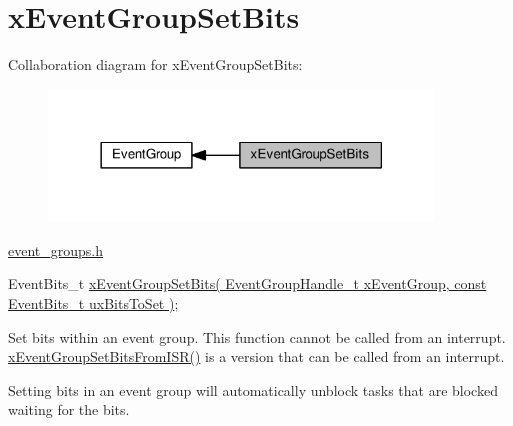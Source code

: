 \hypertarget{group__xEventGroupSetBits}{}\section{x\+Event\+Group\+Set\+Bits}
\label{group__xEventGroupSetBits}
Collaboration diagram for x\+Event\+Group\+Set\+Bits\+:\nopagebreak
\begin{figure}[H]
\begin{center}
\leavevmode
\includegraphics[width=290pt]{dd/d08/group__xEventGroupSetBits}
\end{center}
\end{figure}
\hyperlink{event__groups_8h}{event\+\_\+groups.\+h} 
\begin{DoxyPre}
   EventBits\_t \hyperlink{event__groups_8h_a02d7b3bb55f7e11d9c47116266c5fb2e}{xEventGroupSetBits( EventGroupHandle\_t xEventGroup, const EventBits\_t uxBitsToSet )};
\end{DoxyPre}


Set bits within an event group. This function cannot be called from an interrupt. \hyperlink{event__groups_8h_a62b68278abac6358369ae8e390988a02}{x\+Event\+Group\+Set\+Bits\+From\+I\+S\+R()} is a version that can be called from an interrupt.

Setting bits in an event group will automatically unblock tasks that are blocked waiting for the bits.


